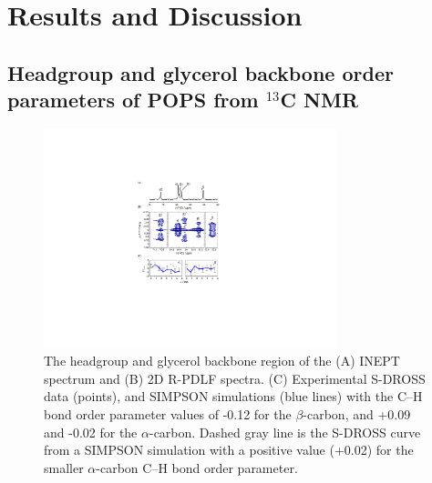 \documentclass[aps,prl,superscriptaddress,twocolumn]{revtex4}
\begin{document}
\section{Results and Discussion}

\subsection{Headgroup and glycerol backbone order parameters of POPS from $^{13}$C NMR}

\begin{figure}[!tb]
  \centering
  \includegraphics[width=8.5cm]{../Figs/fig1_POPS.pdf}
  \caption{\label{PShgSIGNSsimpson}
    The headgroup and glycerol backbone region of the (A) INEPT spectrum and
    (B) 2D R-PDLF spectra.
    (C) Experimental S-DROSS data (points), and SIMPSON simulations (blue lines) with
    the C--H bond order parameter values of -0.12 for the $\beta$-carbon, and +0.09 and -0.02
    for the $\alpha$-carbon.
    Dashed gray line is the S-DROSS curve from a SIMPSON simulation with a positive value (+0.02) 
    for the smaller $\alpha$-carbon C--H bond order parameter.
  }
\end{figure}
\end{document}
